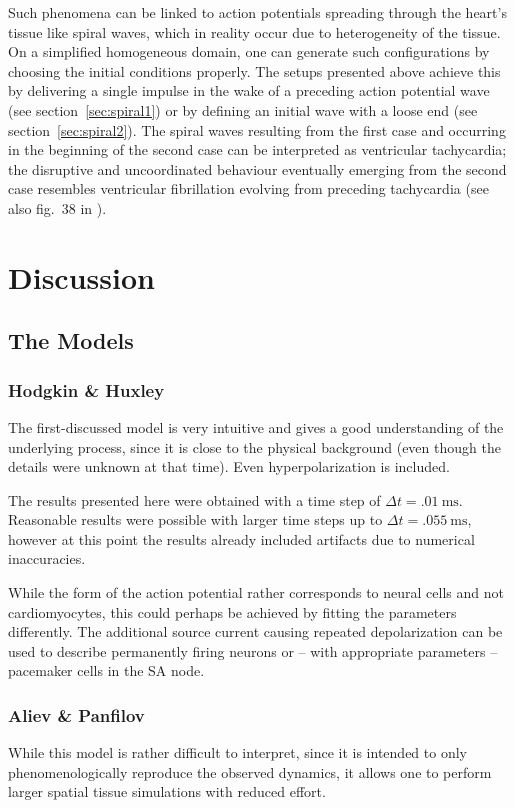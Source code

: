 Such phenomena can be linked to action potentials spreading through the heart's
tissue like spiral waves, which in reality occur due to heterogeneity of the
tissue. On a simplified homogeneous domain, one can generate such
configurations by choosing the initial conditions properly. The setups
presented above achieve this by delivering a single impulse in the wake of a
preceding action potential wave (see section~\ref{sec:spiral1}) or by defining
an initial wave with a loose end (see section~\ref{sec:spiral2}). The spiral
waves resulting from the first case and occurring in the beginning of
the second case can be interpreted as ventricular tachycardia; the disruptive
and uncoordinated behaviour eventually emerging from the second case resembles
ventricular fibrillation evolving from preceding tachycardia (see also fig.~38
in \cite{Cherry2008}).


\section{Discussion}
\subsection{The Models}
\subsubsection{Hodgkin \& Huxley}
The first-discussed model is very intuitive and gives a good understanding of
the underlying process, since it is close to the physical background (even
though the details were unknown at that time). Even hyperpolarization is
included.

The results presented here were obtained with a time step of
$\Delta{t}=\SI{.01}{\milli\second}$. Reasonable results were possible with
larger time steps up to $\Delta{t}=\SI{.055}{\milli\second}$, however at this
point the results already included artifacts due to numerical inaccuracies.

While the form of the action potential rather corresponds to neural cells and
not cardiomyocytes, this could perhaps be achieved by fitting the parameters
differently. The additional source current causing repeated depolarization
can be used to describe permanently firing neurons or -- with
appropriate parameters -- pacemaker cells in the SA node.

\subsubsection{Aliev \& Panfilov}
While this model is rather difficult to interpret, since it is intended to
only phenomenologically reproduce the observed dynamics, it allows one to
perform larger spatial tissue simulations with reduced effort.

